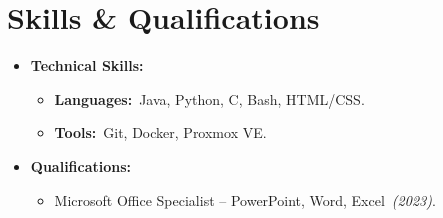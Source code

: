 \documentclass[letterpaper, 12pt]{article}
\newenvironment{ListHeading}{
    \begin{itemize}[
        leftmargin=0.1in, label={},
        itemsep=0.4em, parsep=0pt
    ]
}{ \end{itemize} }
\newenvironment{ListSubheading}{
    \begin{itemize}[
        leftmargin=0.15in, label={},
        itemsep=0.2em, parsep=0pt, topsep=-0.5em
    ]
}{ \end{itemize} }
\newcommand{\listItemHeading}[1]{
    \item
    \textbf{#1}
}
\newcommand{\listItemSubheading}[3][]{
    \item[#1]
    #2 \hfill \textit{#3}
}
\begin{document}
\section{Skills \& Qualifications}
    \begin{ListHeading}
        \listItemHeading
            {Technical Skills:}
            \begin{ListSubheading}
                \listItemSubheading[\textbullet]
                {
                    \textbf{Languages:}\
                    Java, Python, C, Bash, HTML/CSS.
                }{}
                \listItemSubheading[\textbullet]
                {
                    \textbf{Tools:}\
                    Git, Docker, Proxmox VE.
                }{}
            \end{ListSubheading}
        \listItemHeading
            {Qualifications:}
            \begin{ListSubheading}
                \listItemSubheading[\textbullet]
                {
                    Microsoft Office Specialist -- PowerPoint, Word, Excel\
                    \textit{(2023)}.
                }{}
            \end{ListSubheading}
    \end{ListHeading}
\end{document}
